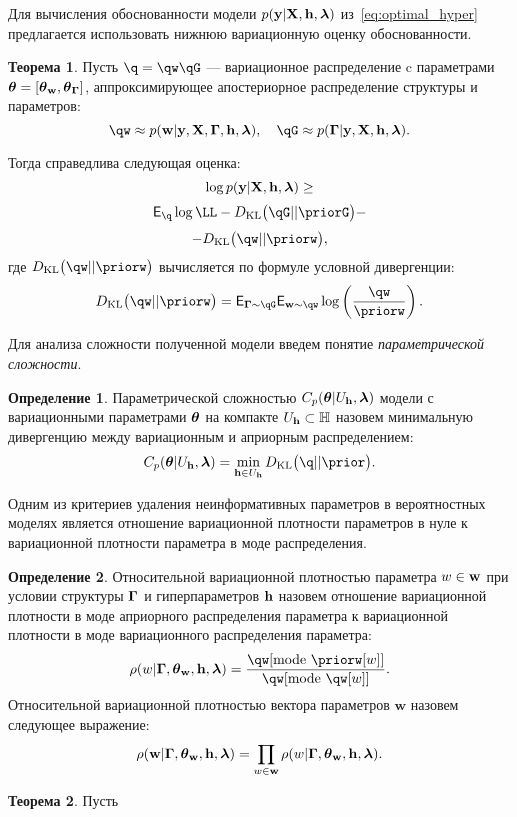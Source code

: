 \documentclass[11pt, a5paper]{dissert}
\theoremstyle{definition}
\newtheorem{theorem}{Теорема}
\newtheorem{defin}{Определение}
\begin{document}
{Для вычисления обоснованности модели $p(\mathbf{y}|\mathbf{X}, \mathbf{h},\boldsymbol{\lambda})$ из~\eqref{eq:optimal_hyper} предлагается использовать нижнюю вариационную оценку обоснованности.

\begin{theorem}
Пусть $\q = \qw \qG$ --- вариационное распределение c параметрами $\boldsymbol{\theta}= [\boldsymbol{\theta}_\mathbf{w}, \boldsymbol{\theta}_{\boldsymbol{\Gamma}} ]$, аппроксимирующее апостериорное распределение структуры и параметров:
\[
   \qw  \approx \postw, \quad    \qG \approx \postG.
\]

Тогда справедлива следующая оценка:
\begin{equation}
\label{eq:full_elbo}
\log p(\mathbf{y}|\mathbf{X}, \mathbf{h},\boldsymbol{\lambda}) \geq
\end{equation}
\[
 \E_{\q}  \log \LL - \KL{\qG}{\priorG} - 
\]
\[
 - \KL{\qw}{\priorw},
\]
где $\KL{\qw}{\priorw}$ вычисляется по формуле условной дивергенции:
\[
\KL{\qw}{\priorw} = \E_{\G \sim \qG} \E_{\w \sim \qw} \log \left(\frac{\qw}{\priorw}\right).
\]
\end{theorem}


Для анализа сложности полученной модели введем понятие \textit{параметрической сложности}. 
\begin{defin} 
Параметрической сложностью  $C_p(\boldsymbol{\theta}|U_{\mathbf{h}}, \boldsymbol{\lambda})$ модели с вариационными параметрами $\boldsymbol{\theta}$ на компакте $U_{\mathbf{h}} \subset \mathbb{H}$ назовем минимальную дивергенцию между вариационным и априорным распределением:
\[
C_p(\teta|\Uh, \lam) = \min_{\h \in \Uh} \KL{\q}{\prior}.
\]
\end{defin}

Одним из критериев удаления неинформативных параметров в вероятностных моделях является отношение вариационной плотности параметров в нуле к вариационной плотности параметра в моде распределения.
\begin{defin}
Относительной вариационной   плотностью параметра $w \in \mathbf{w}$  при условии структуры $\boldsymbol{\Gamma}$ и гиперпараметров $\mathbf{h}$ назовем отношение вариационной плотности в моде априорного распределения параметра к вариационной плотности в моде вариационного распределения параметра:
\[
\rho(w|\G,\tetaw, \h,\lam)=\frac{\qw[\text{mode}~{\priorw[w]}]}{\qw[\text{mode}~{\qw[w]}]}.
\]
Относительной вариационной плотностью вектора параметров $\mathbf{w}$ назовем следующее выражение:
\begin{equation}
\label{eq:rho_general}
    {\rho}(\mathbf{w}|\boldsymbol{\Gamma}, \boldsymbol{\theta}_\mathbf{w}, \mathbf{h},\boldsymbol{\lambda}) = \prod_{w \in \mathbf{w}}\rho(w|\boldsymbol{\Gamma},\boldsymbol{\theta}_\mathbf{w},\mathbf{h},\boldsymbol{\lambda}).
\end{equation}

\end{defin}

\begin{theorem}
Пусть
\begin{enumerate}


\end{enumerate}
\end{theorem}}
\end{document}
